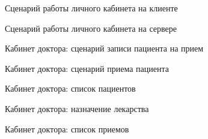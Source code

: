 
\begin{figure}[h]
\caption{Сценарий работы личного кабинета на клиенте}
\label{app:sequence_client}
\end{figure}

\newpage
\begin{figure}[h]
\caption{Сценарий работы личного кабинета на сервере}
\label{app:sequence_server}
\end{figure}

\newpage
\begin{figure}[h]
\caption{Кабинет доктора: сценарий записи пациента на прием}
\label{app:patient_assigning_appointment_seq_diagr}
\end{figure}

\newpage
\begin{figure}[h]
\caption{Кабинет доктора: сценарий приема пациента}
\label{app:doctor_cabient_appointment}


\end{figure}

\newpage
\begin{figure}[h]
\caption{Кабинет доктора: список пациентов}
\label{app:doctor_cabinet_patients}
\end{figure}

\newpage \begin{figure}[h]
\caption{Кабинет доктора: назначение лекарства}
\label{app:doctor_cabinet_medicament}
\end{figure}

\newpage \begin{figure}[h]
\caption{Кабинет доктора: список приемов}
\label{app:doctor_cabinet_appointments}
\end{figure}

